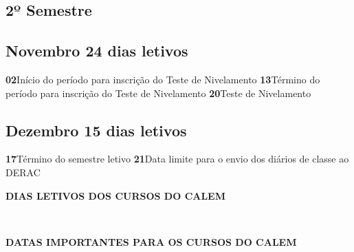 \documentclass[thesis]{hmcposter}
\begin{document}
\begin{poster}
\section{\hfill \color{hmcorange}2º Semestre}
							\subsection{Novembro \hfill 24 dias letivos}\textbf{02}\qquad Início do período para inscrição do Teste de Nivelamento \newline \null\textbf{13}\qquad Término do período para inscrição do Teste de Nivelamento \newline \null\textbf{20}\qquad Teste de Nivelamento \newline \null\subsection{Dezembro \hfill 15 dias letivos}\textbf{17}\qquad Término do semestre letivo \newline \null\textbf{21}\qquad Data limite para o envio dos diários de classe ao DERAC \newline \null\newpage
~
\vfill
\begin{center}
\large \textbf{DIAS LETIVOS DOS CURSOS DO CALEM}
\newline
\null
\newline
\begin{table}
\centering
{}
\end{table}
\newline
\null
\newline
\end{center}
\vfill
\null
\columnbreak
~
\vfill
\begin{center}
\large \textbf{DATAS IMPORTANTES PARA OS CURSOS DO CALEM}
\newline
\null
\newline

\end{center}
\end{poster}
\end{document}
